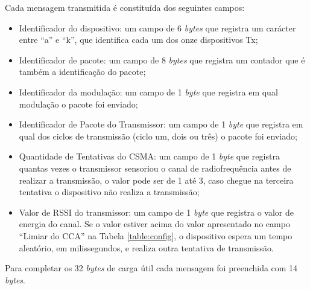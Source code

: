 Cada mensagem transmitida é constituída dos seguintes campos:
\begin{itemize}
  \label{table:estruturaTx}
  \item Identificador do dispositivo: um campo de 6 \emph{bytes} que registra um carácter entre ``a'' e ``k'', que identifica cada um dos onze dispositivos Tx;
  \item Identificador de pacote: um campo de 8 \emph{bytes} que registra um contador que é também a identificação do pacote;
  \item Identificador da modulação: um campo de 1 \emph{byte} que registra em qual modulação o pacote foi enviado;
  \item Identificador de Pacote do Transmissor: um campo de 1 \emph{byte} que registra em qual dos ciclos de transmissão (ciclo um, dois ou três) o pacote foi enviado;
  \item Quantidade de Tentativas do CSMA: um campo de 1 \emph{byte} que registra quantas vezes o transmissor sensoriou o canal de radiofrequência antes de realizar a transmissão, o valor pode ser de 1 até 3, caso chegue na terceira tentativa o dispositivo não realiza a transmissão;
  \item Valor de RSSI do transmissor: um campo de 1 \emph{byte} que registra o valor de energia do canal. Se o valor estiver acima do valor apresentado no campo ``Limiar do CCA'' na Tabela \ref{table:config}, o dispositivo espera um tempo aleatório, em milissegundos, e realiza outra tentativa de transmissão.
\end{itemize}

Para completar os 32 \emph{bytes} de carga útil cada mensagem foi preenchida com 14 \emph{bytes}.

